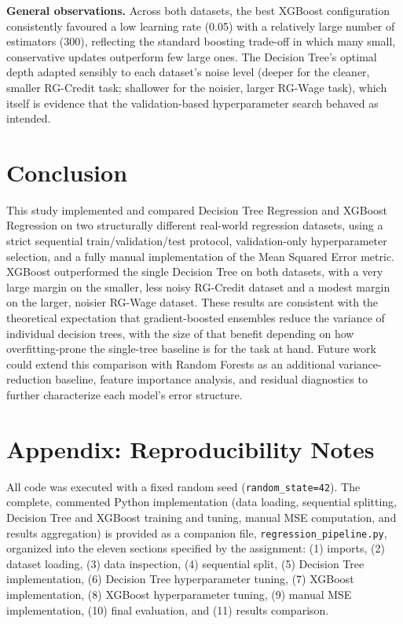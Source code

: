 \documentclass[11pt]{article}
\begin{document}
\textbf{General observations.} Across both datasets, the best XGBoost configuration consistently favoured a low learning rate (0.05) with a relatively large number of estimators (300), reflecting the standard boosting trade-off in which many small, conservative updates outperform few large ones. The Decision Tree's optimal depth adapted sensibly to each dataset's noise level (deeper for the cleaner, smaller RG-Credit task; shallower for the noisier, larger RG-Wage task), which itself is evidence that the validation-based hyperparameter search behaved as intended.

\section{Conclusion}
This study implemented and compared Decision Tree Regression and XGBoost Regression on two structurally different real-world regression datasets, using a strict sequential train/validation/test protocol, validation-only hyperparameter selection, and a fully manual implementation of the Mean Squared Error metric. XGBoost outperformed the single Decision Tree on both datasets, with a very large margin on the smaller, less noisy RG-Credit dataset and a modest margin on the larger, noisier RG-Wage dataset. These results are consistent with the theoretical expectation that gradient-boosted ensembles reduce the variance of individual decision trees, with the size of that benefit depending on how overfitting-prone the single-tree baseline is for the task at hand. Future work could extend this comparison with Random Forests as an additional variance-reduction baseline, feature importance analysis, and residual diagnostics to further characterize each model's error structure.

\appendix
\section*{Appendix: Reproducibility Notes}
All code was executed with a fixed random seed (\texttt{random\_state=42}). The complete, commented Python implementation (data loading, sequential splitting, Decision Tree and XGBoost training and tuning, manual MSE computation, and results aggregation) is provided as a companion file, \texttt{regression\_pipeline.py}, organized into the eleven sections specified by the assignment: (1) imports, (2) dataset loading, (3) data inspection, (4) sequential split, (5) Decision Tree implementation, (6) Decision Tree hyperparameter tuning, (7) XGBoost implementation, (8) XGBoost hyperparameter tuning, (9) manual MSE implementation, (10) final evaluation, and (11) results comparison.
\end{document}
